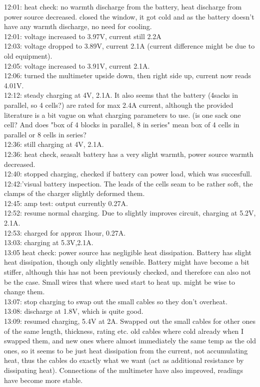 12:01: heat check: no warmth discharge from the battery, heat discharge from power source decreased. closed the window, it got cold and as the battery doesn't have any warmth discharge, no need for cooling.\\
12:01: voltage increased to 3.97V, current still 2.2A\\
12:03: voltage dropped to 3.89V, current 2.1A (current difference might be due to old equipment).\\
12:05: voltage increased to 3.91V, current 2.1A.\\
12:06: turned the multimeter upside down, then right side up, current now reads 4.01V.\\
12:12: steady charging at 4V, 2.1A. It also seems that the battery (4sacks in parallel, so 4 cells?) are rated for max 2.4A current, although the provided literature is a bit vague on what charging parameters to use. (is one sack one cell? And does "box of 4 blocks in parallel, 8 in series" mean box of 4 cells in parallel or 8 cells in series?\\
12:36: still charging at 4V, 2.1A.\\
12:36: heat check, seasalt battery has a very slight warmth, power source warmth decreased.\\
12:40: stopped charging, checked if battery can power load, which was succesfull.\\
12:42:'visual battery inspection. The leads of the cells seam to be rather soft, the clamps of the charger slightly deformed them.\\
12:45: amp test: output currently 0.27A.\\
12:52: resume normal charging. Due to slightly improves circuit, charging at 5.2V, 2.1A.\\
12:53: charged for approx 1hour, 0.27A.\\
13:03: charging at 5.3V,2.1A.\\
13:05 heat check: power source has negligible heat dissipation. Battery has slight heat dissipation, though only slightly sensible. Battery might have become a bit stiffer, although this has not been previously checked, and therefore can also not be the case. Small wires that where used start to heat up. might be wise to change them.\\
13:07: stop charging to swap out the small cables so they don't overheat.\\
13:08: discharge at 1.8V, which is quite good.\\
13:09: resumed charging, 5.4V at 2A. Swapped out the small cables for other ones of the same length, thickness, rating etc. old cables where cold already when I swapped them, and new ones where almost immediately the same temp as the old ones, so it seems to be just heat dissipation from the current, not accumulating heat, thus the cables do exactly what we want (act as additional resistance by dissipating heat). Connections of the multimeter have also improved, readings have become more stable.\\
